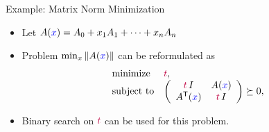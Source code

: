 \documentclass[10pt,ignorenonframetext,serif,onlymath]{beamer}
\providecommand{\tightlist}{%
  \setlength{\itemsep}{0pt}\setlength{\parskip}{0pt}}
\begin{document}
\begin{frame}{Example: Matrix Norm Minimization}
\protect\hypertarget{example-matrix-norm-minimization}{}

\begin{itemize}
\tightlist
\item
  Let \(A({\color{blue}x}) = A_0 + x_1 A_1 + \cdots + x_n A_n\)
\item
  Problem \(\min_x \| A({\color{blue}x}) \|\) can be reformulated as
  \[\begin{array}{ll}
       \text{minimize}      & {\color{purple}t}, \\
       \text{subject to}    & \left(
   \begin{array}{cc}
    {\color{purple}t}\,I   & A({\color{blue}x}) \\
    A^\mathsf{T}({\color{blue}x}) & {\color{purple}t}\,I
   \end{array} \right) \succeq 0,
   \end{array}\]
\item
  Binary search on \({\color{purple}t}\) can be used for this problem.
\end{itemize}

\end{frame}
\end{document}

